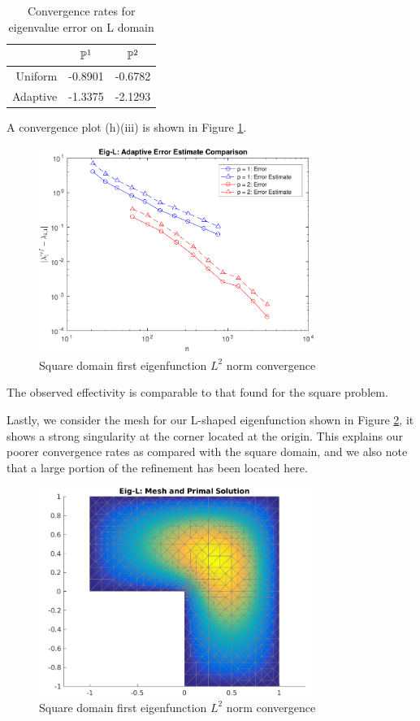 \documentclass{article}
\begin{document}
\begin{itemize}
	\begin{table}[H]
		\centering
		\begin{tabular}{r||c|c}
			& \(\mathbb{P}^1 \) & \(\mathbb{P}^2 \) \\
			\hline
			Uniform & -0.8901 &  -0.6782 \\
			\hline
			Adaptive & -1.3375  & -2.1293 \\
		\end{tabular}
		\caption{Convergence rates for eigenvalue error on L domain}
		\label{tab:33}
	\end{table}
	
	A convergence plot (h)(iii) is shown in Figure \ref{fig:eigl_conv_2}.
	\begin{figure}[H]
		\centering
		\includegraphics[width=0.8\textwidth]{eigl_conv_2.pdf}
		\caption{Square domain first eigenfunction \(L^2\) norm convergence}
		\label{fig:eigl_conv_2}
	\end{figure}
	The observed effectivity is comparable to that found for the square problem.
	
	
	Lastly, we consider the mesh for our L-shaped eigenfunction shown in Figure \ref{fig:eigl_soln}, it shows a strong singularity at the corner located at the origin. This explains our poorer convergence rates as compared with the square domain, and we also note that a large portion of the refinement has been located here. 
	\begin{figure}[H]
		\centering
		\includegraphics[width=0.8\textwidth]{eigl_mesh.pdf}
		\caption{Square domain first eigenfunction \(L^2\) norm convergence}
		\label{fig:eigl_soln}
	\end{figure}
	

\end{itemize}
\end{document}
